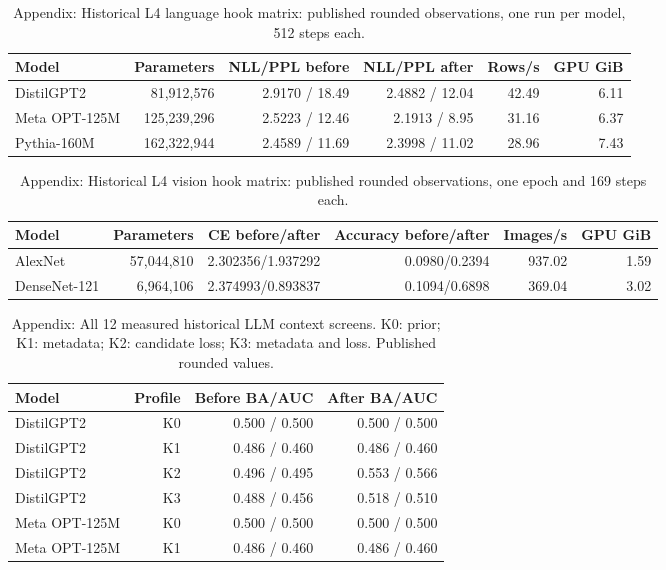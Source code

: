 {\begin{table}[t]
\centering\small
\caption{Appendix: Historical L4 language hook matrix: published rounded observations, one run per model, 512 steps each.}
\label{tab:llm-hooks}
\begin{tabular}{lrrrrr}
\toprule
Model & Parameters & NLL/PPL before & NLL/PPL after & Rows/s & GPU GiB \\
\midrule
DistilGPT2 & 81,912,576 & 2.9170 / 18.49 & 2.4882 / 12.04 & 42.49 & 6.11 \\
Meta OPT-125M & 125,239,296 & 2.5223 / 12.46 & 2.1913 / 8.95 & 31.16 & 6.37 \\
Pythia-160M & 162,322,944 & 2.4589 / 11.69 & 2.3998 / 11.02 & 28.96 & 7.43 \\
\bottomrule
\end{tabular}
\end{table}
\begin{table}[t]
\centering\small
\caption{Appendix: Historical L4 vision hook matrix: published rounded observations, one epoch and 169 steps each.}
\label{tab:vision-hooks}
\begin{tabular}{lrrrrr}
\toprule
Model & Parameters & CE before/after & Accuracy before/after & Images/s & GPU GiB \\
\midrule
AlexNet & 57,044,810 & 2.302356/1.937292 & 0.0980/0.2394 & 937.02 & 1.59 \\
DenseNet-121 & 6,964,106 & 2.374993/0.893837 & 0.1094/0.6898 & 369.04 & 3.02 \\
\bottomrule
\end{tabular}
\end{table}
\begin{table}[t]
\centering\small
\caption{Appendix: All 12 measured historical LLM context screens. K0: prior; K1: metadata; K2: candidate loss; K3: metadata and loss. Published rounded values.}
\label{tab:contexts}
\begin{tabular}{lrrr}
\toprule
Model & Profile & Before BA/AUC & After BA/AUC \\
\midrule
DistilGPT2 & K0 & 0.500 / 0.500 & 0.500 / 0.500 \\
DistilGPT2 & K1 & 0.486 / 0.460 & 0.486 / 0.460 \\
DistilGPT2 & K2 & 0.496 / 0.495 & 0.553 / 0.566 \\
DistilGPT2 & K3 & 0.488 / 0.456 & 0.518 / 0.510 \\
Meta OPT-125M & K0 & 0.500 / 0.500 & 0.500 / 0.500 \\
Meta OPT-125M & K1 & 0.486 / 0.460 & 0.486 / 0.460 \\

\end{tabular}
\end{table}}
